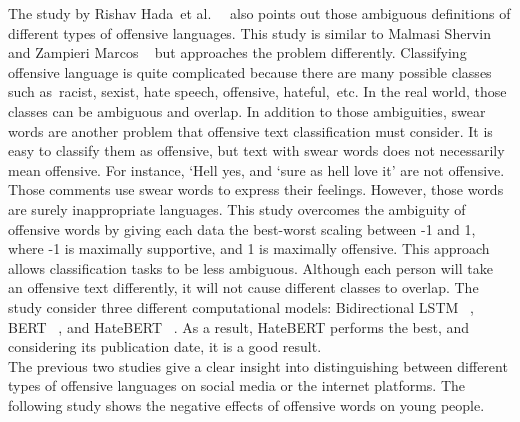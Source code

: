 \documentclass[12pt, natbib=false]{article}
\begin{document}
The study by Rishav Hada et al. ~\cite{hada2021ruddit} also points out those ambiguous definitions of different types of offensive languages. This study is similar to Malmasi Shervin and Zampieri Marcos ~\cite{malmasi2017detecting} but approaches the problem differently. Classifying offensive language is quite complicated because there are many possible classes such as racist, sexist, hate speech, offensive, hateful, etc. In the real world, those classes can be ambiguous and overlap. In addition to those ambiguities, swear words are another problem that offensive text classification must consider. It is easy to classify them as offensive, but text with swear words does not necessarily mean offensive. For instance, ‘Hell yes, and ‘sure as hell love it’ are not offensive. Those comments use swear words to express their feelings. However, those words are surely inappropriate languages. This study overcomes the ambiguity of offensive words by giving each data the best-worst scaling between -1 and 1, where -1 is maximally supportive, and 1 is maximally offensive. This approach allows classification tasks to be less ambiguous. Although each person will take an offensive text differently, it will not cause different classes to overlap. The study consider three different computational models: Bidirectional LSTM ~\cite{pennington2014glove}, BERT ~\cite{devlin2018bert}, and HateBERT ~\cite{caselli2020hatebert}. As a result, HateBERT performs the best, and considering its publication date, it is a good result. \\
The previous two studies give a clear insight into distinguishing between different types of offensive languages on social media or the internet platforms. The following study shows the negative effects of offensive words on young people. 
\end{document}
